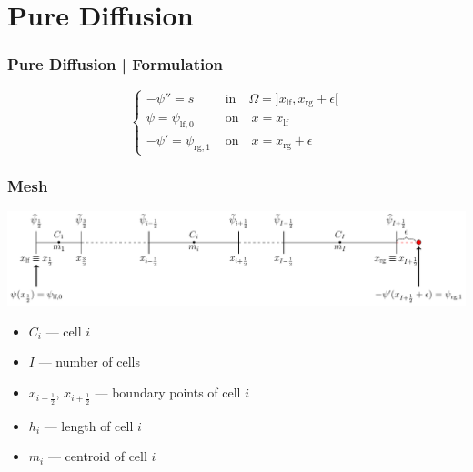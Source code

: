 \documentclass[10pt,fleqn]{beamer}
\begin{document}
 


 
\section{Pure Diffusion}

\begin{frame}
\frametitle{Pure Diffusion | Formulation}

\[
\begin{cases}
-\psi''=s & \text{ in}\quad  \Omega=]x_\text{lf},x_\text{rg}+\epsilon[\\
\psi=\psi_{\text{lf},0} & \text{ on}\quad  x=x_\text{lf}\\
-\psi'=\psi_{\text{rg},1} & \text{ on}\quad  x=x_\text{rg}+\epsilon
\end{cases}
\]

\end{frame}

\begin{frame}
\frametitle{Mesh}

\begin{center}
\includegraphics[width=\textwidth]{images/mesh_notation_reconstructions/mesh_notation_reconstructions}
\end{center}

\begin{itemize}
\item $C_i$ --- cell $i$
\item $I$ --- number of cells
\item $x_{i-\frac{1}{2}}$, $x_{i+\frac{1}{2}}$ --- boundary points of cell $i$
\item $h_i$ --- length of cell $i$
\item $m_i$ --- centroid of cell $i$
\end{itemize}

\end{frame}
\end{document}
